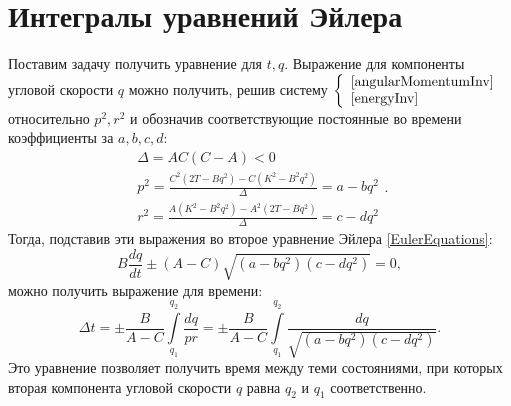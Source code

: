 \documentclass{article}
\begin{document}
\section{Интегралы уравнений Эйлера}
Поставим задачу получить уравнение для \begin{math} t, q \end{math}. 
Выражение для компоненты угловой скорости \begin{math} q \end{math} можно получить, решив систему
\begin{math}
\left\{
\begin{array}{l}
\ref{angularMomentumInv}\\
\ref{energyInv}
\end{array}
\right.
\end{math}
относительно \begin{math} p^2, r^2\end{math} и обозначив соответствующие постоянные во времени коэффициенты за \begin{math} a, b, c, d \end{math}:
\begin{equation}
\label{prEquations}
\begin{array}{l}
\Delta=AC(C-A)<0\\
p^2=\frac{C^2(2T-Bq^2)-C(K^2-B^2q^2)}{\Delta}=a-bq^2\\
r^2=\frac{A(K^2-B^2q^2)-A^2(2T-Bq^2)}{\Delta}=c-dq^2
\end{array}.
\end{equation}
Тогда, подставив эти выражения во второе уравнение Эйлера \ref{EulerEquations}:
\begin{equation}
B\frac{dq}{dt}\pm(A-C)\sqrt{(a-bq^2)(c-dq^2)}=0,
\end{equation}
можно получить выражение для времени:
\begin{equation}
\label{timeEquation}
\Delta t=\pm\frac{B}{A-C}{\int\limits_{q_1}^{q_2}\frac{dq}{pr}}=
\pm\frac{B}{A-C}{\int\limits_{q_1}^{q_2}\frac{dq}{\sqrt{(a-bq^2)(c-dq^2)}}}.
\end{equation}
Это уравнение позволяет получить время между теми состояниями, при которых вторая компонента угловой скорости \begin{math} q \end{math} равна \begin{math} q_2 \end{math} и \begin{math} q_1 \end{math} соответственно.
\end{document}
